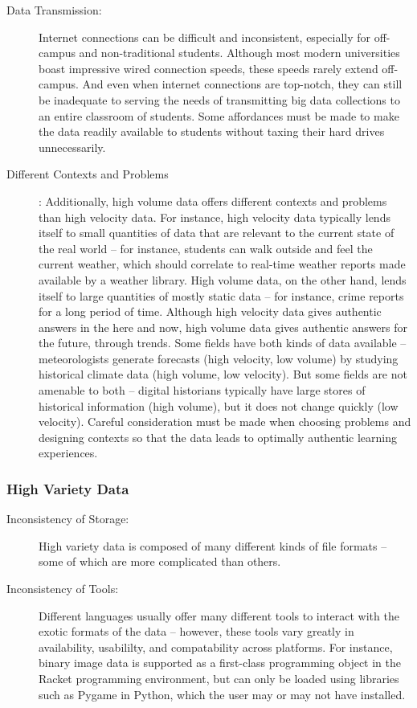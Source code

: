 \begin{description}
	\item[Data Transmission:] Internet connections can be difficult and inconsistent, especially for off-campus
and non-traditional students. Although most modern universities boast impressive wired connection
speeds, these speeds rarely extend off-campus. And even when internet connections are top-notch,
they can still be inadequate to serving the needs of transmitting big data collections to an entire
classroom of students. Some affordances must be made to make the data readily available to students without taxing their hard drives unnecessarily.
	\item[Different Contexts and Problems]: Additionally, high volume data offers different contexts and problems than high velocity data.
For instance, high velocity data typically lends itself to small quantities of data that are relevant to the current state of the real world -- for instance, students can walk outside and feel the current weather, which should correlate to real-time weather reports made available by a weather library.
High volume data, on the other hand, lends itself to large quantities of mostly static data -- for instance, crime reports for a long period of time.
Although high velocity data gives authentic answers in the here and now, high volume data gives authentic answers for the future, through trends.
Some fields have both kinds of data available -- meteorologists generate forecasts (high velocity, low volume) by studying historical climate data (high volume, low velocity).
But some fields are not amenable to both -- digital historians typically have large stores of historical information (high volume), but it does not change quickly (low velocity).
Careful consideration must be made when choosing problems and designing contexts so that the data leads to optimally authentic learning experiences.
\end{description}


\subsubsection{High Variety Data}

\begin{description}
\item[Inconsistency of Storage:] High variety data is composed of many different kinds of file formats -- some of which are more complicated than others.
\item[Inconsistency of Tools:] Different languages usually offer many different tools to interact with the exotic formats of the data -- however, these tools vary greatly in availability, usabililty, and compatability across platforms. For instance, binary image data is supported as a first-class programming object in the Racket programming environment, but can only be loaded using libraries such as Pygame in Python, which the user may or may not have installed.
\end{description}

